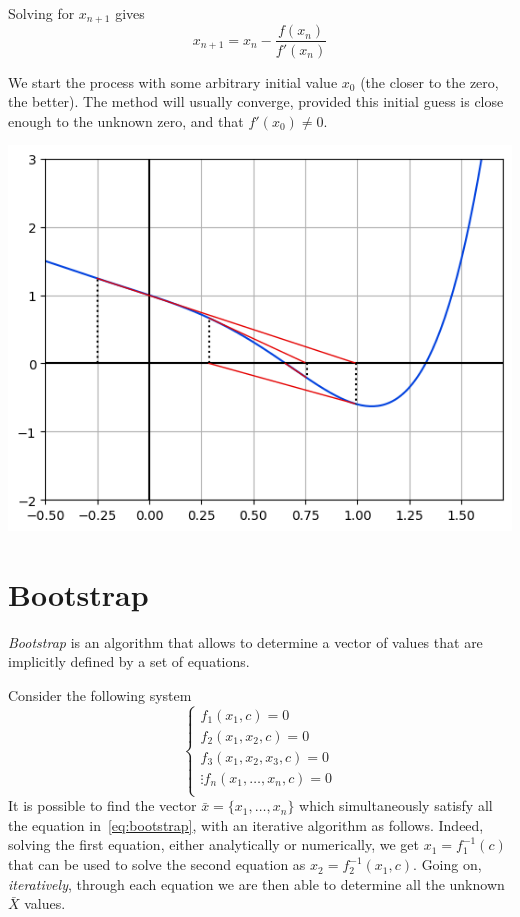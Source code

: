 \documentclass[12pt,a4paper]{article}
\begin{document}
Solving for $x_{n+1}$ gives
\begin{equation}
	x_{n+1}=x_{n}-{\frac {f(x_{n})}{f'(x_{n})}}
\end{equation}

We start the process with some arbitrary initial value $x_0$ (the closer to the zero, the better). The method will usually converge, provided this initial guess is close enough to the unknown zero, and that $f'(x_0) \neq 0$.
\begin{center}
	\includegraphics[width=0.6\linewidth]{addons/newton_method}
\end{center}

\clearpage

\section{Bootstrap}

\emph{Bootstrap} is an algorithm that allows to determine a vector of values that are implicitly defined by a set of equations.

Consider the following system 
\begin{equation}
	\begin{cases}
		f_1(x_1, c) = 0\\
		f_2(x_1, x_2, c) = 0\\
		f_3(x_1, x_2, x_3, c) = 0\\
		\vdots
		f_n(x_1,\ldots,x_n, c) = 0\\
	\end{cases}
\label{eq:bootstrap}
\end{equation}
It is possible to find the vector $\bar{x} = \{x_1,\ldots,x_n\}$ which simultaneously satisfy all the equation in~\ref{eq:bootstrap}, with an iterative algorithm as follows.
Indeed, solving the first equation, either analytically or numerically, we get $x_1 = f_1^{-1}(c)$ that can be used to solve the second equation as $x_2 = f_2^{-1}(x_1, c)$.
Going on, \emph{iteratively}, through each equation we are then able to determine all the unknown $\bar{X}$ values.
\end{document}
